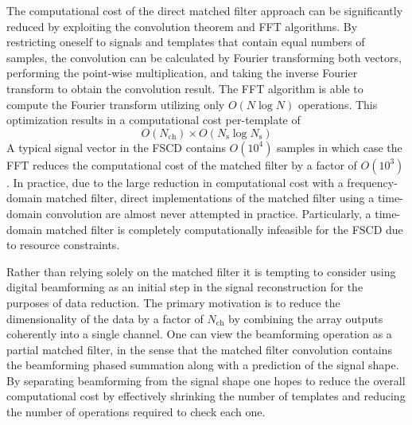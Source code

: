 The computational cost of the direct matched filter approach can be significantly reduced by exploiting the convolution theorem and FFT algorithms. By restricting oneself to signals and templates that contain equal numbers of samples, the convolution can be calculated by Fourier transforming both vectors, performing the point-wise multiplication, and taking the inverse Fourier transform to obtain the convolution result. The FFT algorithm is able to compute the Fourier transform utilizing only $O(N\log{N})$ operations. This optimization results in a computational cost per-template of
\begin{equation}
    O(N_\mathrm{ch})\times O(N_\mathrm{s}\log{N_\mathrm{s}})
\end{equation}
A typical signal vector in the FSCD contains $O(10^4)$ samples in which case the FFT reduces the computational cost of the matched filter by a factor of $O(10^3)$. In practice, due to the large reduction in computational cost with a frequency-domain matched filter, direct implementations of the matched filter using a time-domain convolution are almost never attempted in practice. Particularly, a time-domain matched filter is completely computationally infeasible for the FSCD due to resource constraints.

Rather than relying solely on the matched filter it is tempting to consider using digital beamforming as an initial step in the signal reconstruction for the purposes of data reduction. The primary motivation is to reduce the dimensionality of the data by a factor of $N_\mathrm{ch}$ by combining the array outputs coherently into a single channel. One can view the beamforming operation as a partial matched filter, in the sense that the matched filter convolution contains the beamforming phased summation along with a prediction of the signal shape. By separating beamforming from the signal shape one hopes to reduce the overall computational cost by effectively shrinking the number of templates and reducing the number of operations required to check each one.


